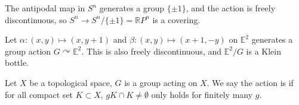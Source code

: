 \begin{example}
    The antipodal map in $S^n$ generates a group $\{\pm 1\}$,
	and the action is freely discontinuous,
	so $S^n \to S^n / \{\pm 1\} = \mathbb{R}P^n$ is a covering.

	Let $\alpha: (x, y)\mapsto (x, y+1)$ and $\beta: (x, y)\mapsto (x+1, -y)$ on
	$\mathbb{E}^2$ generates a group action $G \curvearrowright \mathbb{E}^2$.
	This is also freely discontinuous, and $\mathbb{E}^2 / G$ is a Klein bottle.
\end{example}

Let $X$ be a topological space, $G$ is a group acting on $X$.
We say the action is  if
for all compact set $K \subset X$, $gK \cap K \ne \emptyset$ only
holds for finitely many $g$.
